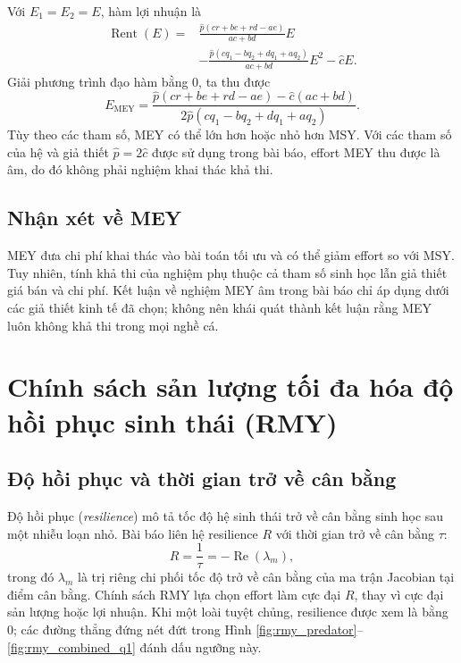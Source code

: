 Với \(E_1=E_2=E\), hàm lợi nhuận là
\begin{equation}
\label{eq:rent_combined}
\begin{aligned}
\operatorname{Rent}(E)
={}&\frac{\hat{p}(cr+be+rd-ae)}{ac+bd}E\\
&-\frac{\hat{p}(cq_1-bq_2+dq_1+aq_2)}{ac+bd}E^2-\hat{c}E.
\end{aligned}
\end{equation}
Giải phương trình đạo hàm bằng 0, ta thu được
\begin{equation}
\label{eq:mey_combined}
E_{\mathrm{MEY}}=
\frac{\hat{p}(cr+be+rd-ae)-\hat{c}(ac+bd)}
{2\hat{p}(cq_1-bq_2+dq_1+aq_2)}.
\tag{33}
\end{equation}
Tùy theo các tham số, MEY có thể lớn hơn hoặc nhỏ hơn MSY. Với các tham số của hệ và giả thiết \(\hat{p}=2\hat{c}\) được sử dụng trong bài báo, effort MEY thu được là âm, do đó không phải nghiệm khai thác khả thi.

\subsection{Nhận xét về MEY}

MEY đưa chi phí khai thác vào bài toán tối ưu và có thể giảm effort so với MSY. Tuy nhiên, tính khả thi của nghiệm phụ thuộc cả tham số sinh học lẫn giả thiết giá bán và chi phí. Kết luận về nghiệm MEY âm trong bài báo chỉ áp dụng dưới các giả thiết kinh tế đã chọn; không nên khái quát thành kết luận rằng MEY luôn không khả thi trong mọi nghề cá.

\section{Chính sách sản lượng tối đa hóa độ hồi phục sinh thái (RMY)}
\label{sec:rmy}

\subsection{Độ hồi phục và thời gian trở về cân bằng}

Độ hồi phục (\textit{resilience}) mô tả tốc độ hệ sinh thái trở về cân bằng sinh học sau một nhiễu loạn nhỏ. Bài báo liên hệ resilience \(R\) với thời gian trở về cân bằng \(\tau\):
\[
R=\frac{1}{\tau}=-\operatorname{Re}(\lambda_m),
\]
trong đó \(\lambda_m\) là trị riêng chi phối tốc độ trở về cân bằng của ma trận Jacobian tại điểm cân bằng. Chính sách RMY lựa chọn effort làm cực đại \(R\), thay vì cực đại sản lượng hoặc lợi nhuận. Khi một loài tuyệt chủng, resilience được xem là bằng 0; các đường thẳng đứng nét đứt trong Hình \ref{fig:rmy_predator}--\ref{fig:rmy_combined_q1} đánh dấu ngưỡng này.

